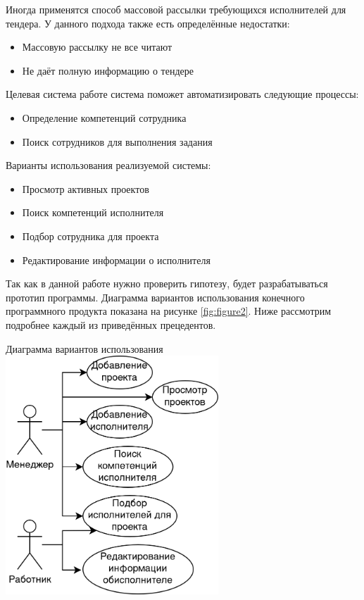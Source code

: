 \documentclass[PI,KR]{HSEUniversity}
\begin{document}
Иногда применятся способ массовой рассылки требующихся исполнителей для тендера. У данного подхода также есть определённые недостатки:
\begin{itemize}
	\item Массовую рассылку не все читают
	\item Не даёт полную информацию о тендере
\end{itemize}

Целевая система работе система поможет автоматизировать следующие процессы:
\begin{itemize}
	\item Определение компетенций сотрудника
	\item Поиск сотрудников для выполнения задания
\end{itemize}
Варианты использования реализуемой системы:
\begin{itemize}
	\item Просмотр активных проектов
	\item Поиск компетенций исполнителя
	\item Подбор сотрудника для проекта
	\item Редактирование информации о исполнителя
\end{itemize}

Так как в данной работе нужно проверить гипотезу, будет разрабатываться прототип программы. Диаграмма вариантов использования конечного программного продукта показана на рисунке \ref{fig:figure2}. Ниже рассмотрим подробнее каждый из приведённых прецедентов.
\begin{FIGURE}[h]{Диаграмма вариантов использования \label{fig:figure2}}
	\includegraphics[width=0.6\textwidth]{img/Диаграмма вариантов использования}
\end{FIGURE}
\end{document}

